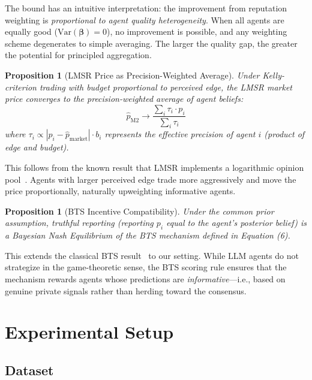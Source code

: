 \documentclass[conference]{IEEEtran}
\newtheorem{proposition}[theorem]{Proposition}
\begin{document}
The bound has an intuitive interpretation: the improvement from reputation weighting is \emph{proportional to agent quality heterogeneity}. When all agents are equally good ($\mathrm{Var}(\boldsymbol{\beta}) = 0$), no improvement is possible, and any weighting scheme degenerates to simple averaging. The larger the quality gap, the greater the potential for principled aggregation.

\begin{proposition}[LMSR Price as Precision-Weighted Average]
\label{prop:lmsr}
Under Kelly-criterion trading with budget proportional to perceived edge, the LMSR market price converges to the precision-weighted average of agent beliefs:
\begin{equation}
    \hat{p}_{\mathrm{M2}} \to \frac{\sum_i \tau_i \cdot p_i}{\sum_i \tau_i}
\end{equation}
where $\tau_i \propto |p_i - \hat{p}_{\mathrm{market}}| \cdot b_i$ represents the effective precision of agent $i$ (product of edge and budget).
\end{proposition}

This follows from the known result that LMSR implements a logarithmic opinion pool~\cite{hanson2007logarithmic}. Agents with larger perceived edge trade more aggressively and move the price proportionally, naturally upweighting informative agents.

\begin{proposition}[BTS Incentive Compatibility]
\label{prop:bts}
Under the common prior assumption, truthful reporting (reporting $p_i$ equal to the agent's posterior belief) is a Bayesian Nash Equilibrium of the BTS mechanism defined in Equation (6).
\end{proposition}

This extends the classical BTS result~\cite{prelec2004bayesian} to our setting. While LLM agents do not strategize in the game-theoretic sense, the BTS scoring rule ensures that the mechanism rewards agents whose predictions are \emph{informative}---i.e., based on genuine private signals rather than herding toward the consensus.


\section{Experimental Setup}
\label{sec:setup}

\subsection{Dataset}
\end{document}
